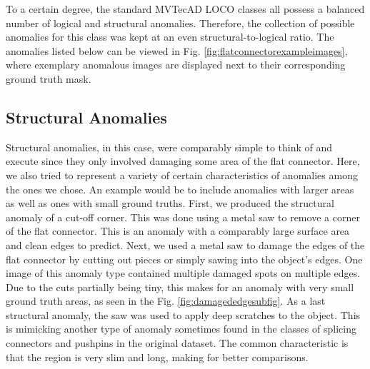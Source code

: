 To a certain degree, the standard MVTecAD LOCO classes all possess a balanced number of logical and structural anomalies. Therefore, the collection of possible anomalies for this class was kept at an even structural-to-logical ratio. The anomalies listed below can be viewed in Fig. \ref{fig:flatconnectorexampleimages}, where exemplary anomalous images are displayed next to their corresponding ground truth mask.

\subsection{Structural Anomalies}
Structural anomalies, in this case, were comparably simple to think of and execute since they only involved damaging some area of the flat connector. Here, we also tried to represent a variety of 
certain characteristics of anomalies among the ones we chose. An example would be to include anomalies with larger areas as well as ones with small ground truths.\newline
First, we produced the structural anomaly of a cut-off corner. This was done using a metal saw to remove a corner of the flat connector. This is an anomaly with a comparably large 
surface area and clean edges to predict. Next, we used a metal saw to damage the edges of the flat connector by cutting out pieces or simply sawing into the object's edges. One image 
of this anomaly type contained multiple damaged spots on multiple edges. Due to the cuts partially being tiny, this makes for an anomaly with very small ground truth areas, as seen in the Fig. 
\ref{fig:damagededgesubfig}. As a last structural anomaly, the saw was used to apply deep scratches to the object. This is mimicking another type of anomaly sometimes found in the classes of splicing connectors and pushpins 
in the original dataset. The common characteristic is that the region is very slim and long, making for better comparisons.


